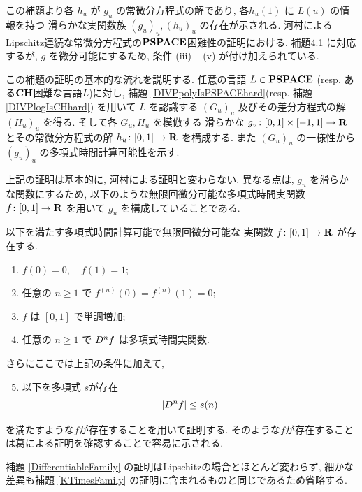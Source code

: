  この補題より各 $h_u$ が $g_u$ の常微分方程式の解であり, 
 各$h_u(1)$ に $L(u)$ の情報を持つ
 滑らかな実関数族 $(g_u)_u, (h_u)_u$ の存在が示される.
 河村によるLipschitz連続な常微分方程式の$\mathbf{PSPACE}$困難性の証明における,
 補題4.1 に対応するが,
 $g$ を微分可能にするため, 条件 (iii) -- (v) が付け加えられている.


 この補題の証明の基本的な流れを説明する.
 任意の言語 $L \in \mathbf{PSPACE}$ (resp. ある$\mathbf{CH}$困難な言語$L$)に対し, 
 補題 \ref{DIVPpolyIsPSPACEhard}(resp. 補題 \ref{DIVPlogIsCHhard})
 を用いて $L$ を認識する $(G_u)_u$ 
 及びその差分方程式の解 $(H_u)_u$ を得る.
 そして各 $G_u, H_u$ を模倣する
 滑らかな $g_u \colon [0,1] \times [-1, 1] \to \mathbf R$ 
 とその常微分方程式の解 $h_u \colon [0,1] \to \mathbf R$ を構成する.
 また $(G_u)_u$ の一様性から $(g_u)_u$ の多項式時間計算可能性を示す.

 上記の証明は基本的に, 河村による証明と変わらない\cite[補題4.1]{kawamura2010lipschitz}.
 異なる点は, $g_u$ を滑らかな関数にするため, 
 以下のような無限回微分可能な多項式時間実関数 $f \colon [0,1] \to \mathbf R$ を用いて
 $g_u$ を構成していることである.

 \begin{lemma}
  \label{SmoothFunction}
  以下を満たす多項式時間計算可能で無限回微分可能な
  実関数 $f \colon [0,1] \to \mathbf R$ が存在する.

  \begin{enumerate}
   \item $f(0) = 0, \quad f(1) = 1$;
   \item 任意の $n \ge 1$ で $f^{(n)}(0) = f^{(n)}(1) = 0$;
   \item $f$ は $[0,1]$ で単調増加;
   \item 任意の $n \ge 1$ で $D^n f$ は多項式時間実関数.
  \end{enumerate}
 \end{lemma}

 さらにここでは上記の条件に加えて, 
 \begin{enumerate}
  \setcounter{enumi}{4} 
  \item 以下を多項式 $s$が存在
	\begin{equation} \label{enum:polynomial-size}
	 |D^n f| \le s(n)
	\end{equation}
 \end{enumerate}
 を満たすような$f$が存在することを用いて証明する.
 そのような$f$が存在することは葛による証明を確認することで容易に示される.

 補題 \ref{DifferentiableFamily} の証明はLipschitzの場合とほとんど変わらず,
 細かな差異も補題 \ref{KTimesFamily} の証明に含まれるものと同じであるため省略する.

